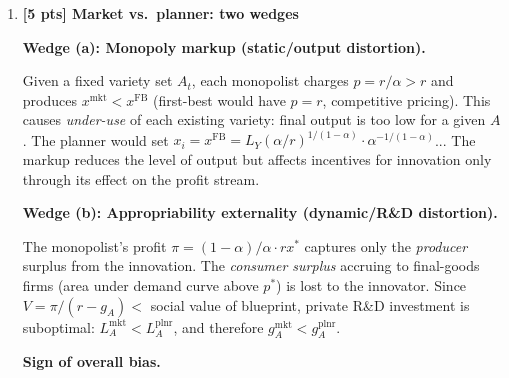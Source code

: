 \documentclass[a4paper,11pt]{article}
\begin{document}
\begin{enumerate}[label=\textbf{(\arabic*)},leftmargin=*]
\begin{answerbox}
\textbf{Jones (1995) fix.}

Replace the linear R\&D equation with:
\[
  \dot{A} = \delta_A A^{\phi} L_A, \qquad \phi < 1
\]
The term $A^{\phi}$ captures diminishing returns to the existing stock of knowledge (``fishing out'' of ideas). On the BGP:
\[
  g_A^* = \frac{n}{1-\phi}
\]
The scale effect is eliminated: $g_A^*$ depends only on the \emph{growth rate} of population $n$, not on the \emph{level} $L$.

\textbf{Theoretical cost.}

Long-run growth is now driven entirely by the exogenous variable $n$. Policy instruments (R\&D subsidies, taxes) can affect the \emph{level} of $A$ (and hence per-capita income) but not its long-run growth rate. In this sense the model is ``semi-endogenous'' rather than fully endogenous, and the engine of long-run growth is again placed outside the model.
\end{answerbox}

\bigskip

\item \textbf{[5 pts] Market vs.\ planner: two wedges}

\begin{answerbox}
\textbf{Wedge (a): Monopoly markup (static/output distortion).}

Given a fixed variety set $A_t$, each monopolist charges $p = r/\alpha > r$ and produces $x^{\mathrm{mkt}} < x^{\mathrm{FB}}$ (first-best would have $p = r$, competitive pricing). This causes \emph{under-use} of each existing variety: final output is too low for a given $A$. The planner would set $x_i = x^{\mathrm{FB}} = L_Y (\alpha/r)^{1/(1-\alpha)} \cdot \alpha^{-1/(1-\alpha)}$... The markup reduces the level of output but affects incentives for innovation only through its effect on the profit stream.

\textbf{Wedge (b): Appropriability externality (dynamic/R\&D distortion).}

The monopolist's profit $\pi = (1-\alpha)/\alpha \cdot r x^*$ captures only the \emph{producer} surplus from the innovation. The \emph{consumer surplus} accruing to final-goods firms (area under demand curve above $p^*$) is lost to the innovator. Since $V = \pi/(r - g_A) < $ social value of blueprint, private R\&D investment is suboptimal: $L_A^{\mathrm{mkt}} < L_A^{\mathrm{plnr}}$, and therefore $g_A^{\mathrm{mkt}} < g_A^{\mathrm{plnr}}$.

\textbf{Sign of overall bias.}


\end{answerbox}
\end{enumerate}
\end{document}
